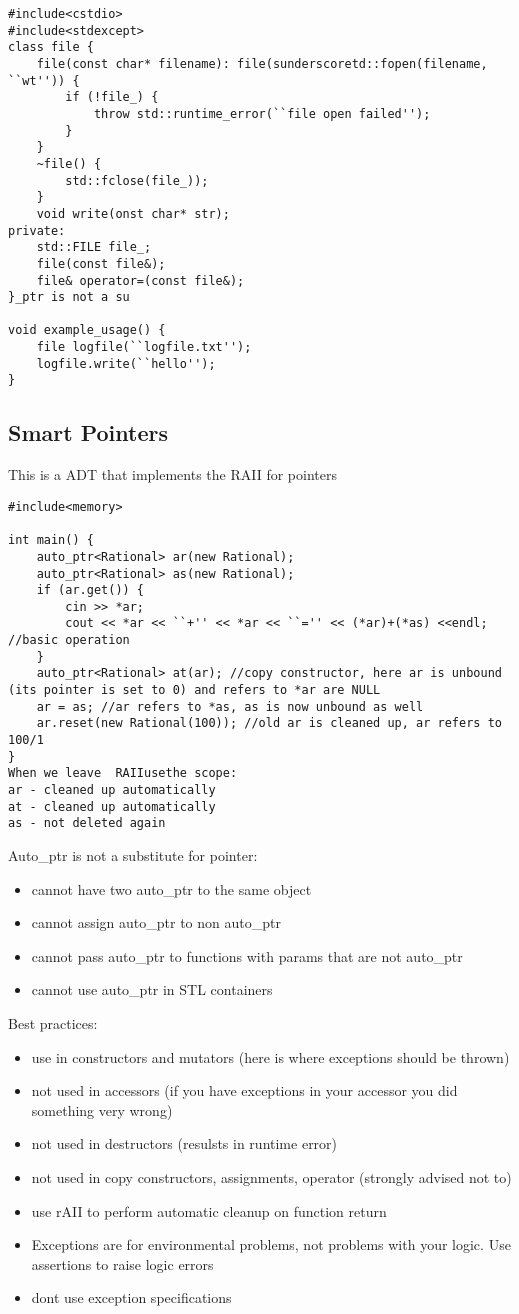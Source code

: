 \documentclass[12pt]{article}
\begin{document}
\begin{verbatim}
#include<cstdio>
#include<stdexcept>
class file {
    file(const char* filename): file(sunderscoretd::fopen(filename, ``wt'')) {
        if (!file_) {
            throw std::runtime_error(``file open failed'');
        }
    }
    ~file() {
        std::fclose(file_));
    }
    void write(onst char* str);
private:
    std::FILE file_;
    file(const file&);
    file& operator=(const file&);
}_ptr is not a su

void example_usage() {
    file logfile(``logfile.txt'');
    logfile.write(``hello'');
}
\end{verbatim}

\subsection{Smart Pointers}
This is a ADT that implements the RAII for pointers

\begin{verbatim}
#include<memory>

int main() {
    auto_ptr<Rational> ar(new Rational);
    auto_ptr<Rational> as(new Rational);
    if (ar.get()) {
        cin >> *ar;
        cout << *ar << ``+'' << *ar << ``='' << (*ar)+(*as) <<endl; //basic operation
    }
    auto_ptr<Rational> at(ar); //copy constructor, here ar is unbound (its pointer is set to 0) and refers to *ar are NULL
    ar = as; //ar refers to *as, as is now unbound as well
    ar.reset(new Rational(100)); //old ar is cleaned up, ar refers to 100/1
}
When we leave  RAIIusethe scope:
ar - cleaned up automatically
at - cleaned up automatically
as - not deleted again
\end{verbatim}


Auto\_ptr is not a substitute for pointer:
\begin{itemize}
    \item cannot have two auto\_ptr to the same object
    \item cannot assign auto\_ptr to non auto\_ptr
    \item cannot pass auto\_ptr to functions with params that are not auto\_ptr
    \item cannot use auto\_ptr in STL containers
\end{itemize}

Best practices:
\begin{itemize}
    \item use in constructors and mutators (here is where exceptions should be thrown)
    \item not used in accessors (if you have exceptions in your accessor you did something very wrong)
    \item not used in destructors (resulsts in runtime error)
    \item not used in copy constructors, assignments, operator (strongly advised not to)
    \item use rAII to perform automatic cleanup on function return
    \item Exceptions are for environmental problems, not problems with your logic. Use assertions to raise logic errors
    \item dont use exception specifications
\end{itemize}
\end{document}
